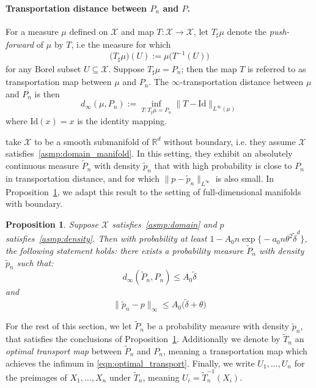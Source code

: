 \documentclass[twoside]{article}
\newcommand{\Reals}{\mathbb{R}}
\newcommand{\1}{\mathbf{1}}
\newcommand{\Rd}{\Reals^d}
\newcommand{\Xset}{\mathcal{X}}
\newcommand{\Leb}{L}
\newcommand{\wt}[1]{\widetilde{#1}}
\newtheorem{proposition}{Proposition}
\theoremstyle{definition}
\theoremstyle{remark}
\begin{document}
\paragraph{Transportation distance between $P_n$ and $P$.}
For a measure $\mu$ defined on $\Xset$ and map $T: \Xset \to \Xset$, let $T_{\sharp}\mu$ denote the \emph{push-forward} of $\mu$ by $T$, i.e the measure for which
\begin{equation*}
\bigl(T_{\sharp}\mu\bigr)(U) := \mu\bigl(T^{-1}(U)\bigr)
\end{equation*}
for any Borel subset $U \subseteq \Xset$. Suppose $T_{\sharp}\mu = P_n$; then the map $T$ is referred to as transportation map between $\mu$ and $P_n$. The  $\infty$-transportation distance between $\mu$ and $P_n$ is then
\begin{equation}
\label{eqn:optimal_transport}
d_{\infty}(\mu,P_n) := \inf_{T: T_{\sharp} \mu = P_n} \|T - \mathrm{Id}\|_{L^{\infty}(\mu)}
\end{equation}
where $\mathrm{Id}(x) = x$ is the identity mapping.

\citet{calder2019} take $\Xset$ to be a smooth submanifold of $\Rd$ without boundary, i.e. they assume $\Xset$ satisfies~\ref{asmp:domain_manifold}. In this setting, they exhibit an absolutely continuous measure $\wt{P}_n$ with density $\wt{p}_n$ that with high probability is close to $P_n$ in transportation distance, and for which $\|p - \wt{p}_n\|_{\Leb^\infty}$ is also small. In Proposition~\ref{prop:optimal_transport}, we adapt this result to the setting of full-dimensional manifolds with boundary.  
\begin{proposition}
	\label{prop:optimal_transport}
	Suppose $\Xset$ satisfies~\ref{asmp:domain} and $p$ satisfies~\ref{asmp:density}. Then with probability at least $1 - A_0 n \exp\bigl\{-a_0 n\theta^2\wt{\delta}^d\bigr\}$, the following statement holds: there exists a probability measure $\wt{P}_n$ with density $\wt{p}_n$ such that:
	\begin{equation}
	\label{eqn:optimal_transport_1}
	d_{\infty}(\wt{P}_n, P_n) \leq A_0 \wt{\delta}
	\end{equation}
	and
	\begin{equation}
	\label{eqn:optimal_transport_2}
	\|\wt{p}_n - p\|_{\infty} \leq A_0\bigl(\wt{\delta} + \theta\bigr)
	\end{equation}
\end{proposition}
For the rest of this section, we let $\wt{P}_n$ be a probability measure with density $\wt{p}_n$, that satisfies the conclusions of Proposition~\ref{prop:optimal_transport}. Additionally we denote by $\wt{T}_n$ an \emph{optimal transport map} between $\wt{P}_n$ and $P_n$, meaning a transportation map which achieves the infimum in \eqref{eqn:optimal_transport}. Finally, we write $U_1,\ldots,U_n$ for the preimages of $X_1,\ldots,X_n$ under $\wt{T}_n$, meaning $U_i = \wt{T}_n^{-1}(X_i)$. 
\end{document}
